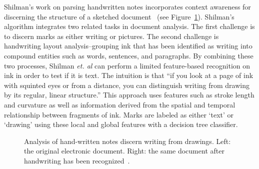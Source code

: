 Shilman's work on parsing handwritten notes incorporates context
awareness for discerning the structure of a sketched
document~\cite{shilman-discerning-structure} (see
Figure~\ref{fig:shilman-text-or-drawing}). Shilman's algorithm
integrates two related tasks in document analysis. The first challenge
is to discern marks as either writing or pictures. The second
challenge is handwriting layout analysis--grouping ink that has been
identified as writing into compound entities such as words, sentences,
and paragraphs. By combining these two processes,
Shilman \textit{et. al} can perform a limited feature-based
recognition on ink in order to test if it is text. The intuition is
that ``if you look at a page of ink with squinted eyes or from a
distance, you can distinguish writing from drawing by its regular,
linear structure.''  This approach uses features such as stroke length
and curvature as well as information derived from the spatial and
temporal relationship between fragments of ink. Marks are labeled as
either `text' or `drawing' using these local and global features with
a decision tree classifier.


\begin{figure}
\centering
{}
\hspace{1cm}

\caption{Analysis of hand-written notes discern writing
                  from drawings. Left: the original electronic
                  document. Right: the same document after handwriting
                  has been
                  recognized~\cite{shilman-discerning-structure}.}

\label{fig:shilman-text-or-drawing}
\end{figure}

